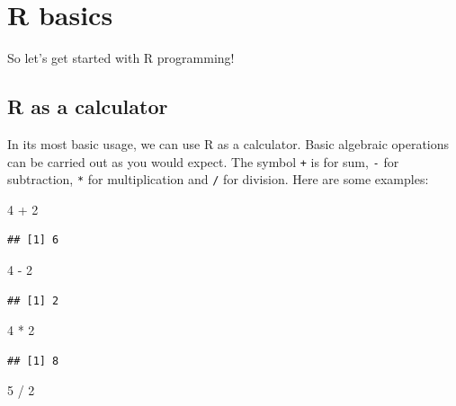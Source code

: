 \documentclass[
]{book}
\newenvironment{Shaded}{\begin{snugshade}}{\end{snugshade}}
\newcommand{\DecValTok}[1]{\textcolor[rgb]{0.00,0.00,0.81}{#1}}
\newcommand{\SpecialCharTok}[1]{\textcolor[rgb]{0.00,0.00,0.00}{#1}}
\begin{document}
\hypertarget{r-basics}{%
\section{R basics}\label{r-basics}}

So let's get started with R programming!

\hypertarget{r-as-a-calculator}{%
\subsection{R as a calculator}\label{r-as-a-calculator}}

In its most basic usage, we can use R as a calculator. Basic algebraic operations can be carried out as you would expect. The symbol \texttt{+} is for sum, \texttt{-} for subtraction, \texttt{*} for multiplication and \texttt{/} for division. Here are some examples:

\begin{Shaded}
\begin{Highlighting}[]
\DecValTok{4} \SpecialCharTok{+} \DecValTok{2}
\end{Highlighting}
\end{Shaded}

\begin{verbatim}
## [1] 6
\end{verbatim}

\begin{Shaded}
\begin{Highlighting}[]
\DecValTok{4} \SpecialCharTok{{-}} \DecValTok{2}
\end{Highlighting}
\end{Shaded}

\begin{verbatim}
## [1] 2
\end{verbatim}

\begin{Shaded}
\begin{Highlighting}[]
\DecValTok{4} \SpecialCharTok{*} \DecValTok{2}
\end{Highlighting}
\end{Shaded}

\begin{verbatim}
## [1] 8
\end{verbatim}

\begin{Shaded}
\begin{Highlighting}[]
\DecValTok{5} \SpecialCharTok{/} \DecValTok{2}
\end{Highlighting}
\end{Shaded}
\end{document}
